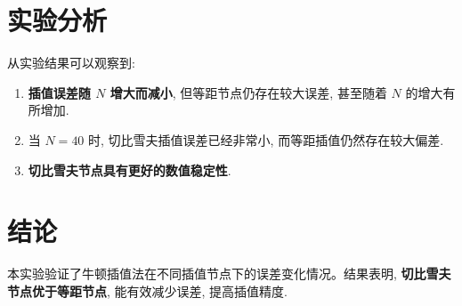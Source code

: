\documentclass[12pt]{article}
\begin{document}
	\section{实验分析}
	从实验结果可以观察到:
	\begin{enumerate}
		\item \textbf{插值误差随 $N$ 增大而减小}, 但等距节点仍存在较大误差, 甚至随着 $N$ 的增大有所增加.
		\item 当 $N = 40$ 时, 切比雪夫插值误差已经非常小, 而等距插值仍然存在较大偏差.
		\item \textbf{切比雪夫节点具有更好的数值稳定性}.
	\end{enumerate}

	\section{结论}
	本实验验证了牛顿插值法在不同插值节点下的误差变化情况。结果表明, \textbf{切比雪夫节点优于等距节点}, 能有效减少误差, 提高插值精度.
\end{document}
